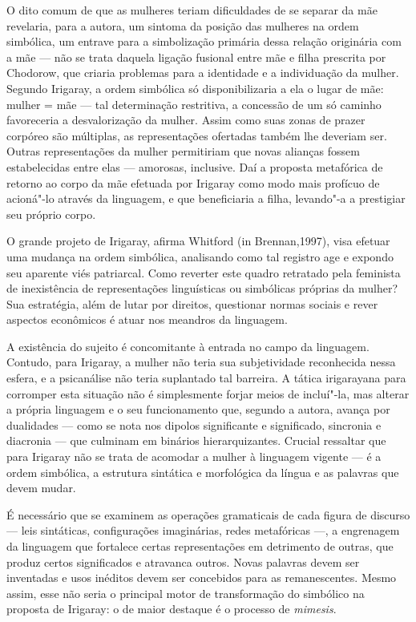 O dito comum de que as mulheres teriam dificuldades de se separar da mãe
revelaria, para a autora, um sintoma da posição das mulheres na ordem
simbólica, um entrave para a simbolização primária dessa relação
originária com a mãe --- não se trata daquela ligação fusional entre mãe
e filha prescrita por Chodorow, que criaria problemas para a identidade
e a individuação da mulher. Segundo Irigaray, a ordem simbólica só
disponibilizaria a ela o lugar de mãe: mulher = mãe --- tal determinação
restritiva, a concessão de um só caminho favoreceria a desvalorização da
mulher. Assim como suas zonas de prazer corpóreo são múltiplas, as
representações ofertadas também lhe deveriam ser. Outras representações
da mulher permitiriam que novas alianças fossem estabelecidas entre elas
--- amorosas, inclusive. Daí a proposta metafórica de retorno ao corpo
da mãe efetuada por Irigaray como modo mais profícuo de acioná"-lo
através da linguagem, e que beneficiaria a filha, levando"-a a prestigiar
seu próprio corpo.

O grande projeto de Irigaray, afirma Whitford (in Brennan,1997), visa
efetuar uma mudança na ordem simbólica, analisando como tal registro age
e expondo seu aparente viés patriarcal. Como reverter este quadro
retratado pela feminista de inexistência de representações linguísticas
ou simbólicas próprias da mulher? Sua estratégia, além de lutar por
direitos, questionar normas sociais e rever aspectos econômicos é atuar
nos meandros da linguagem.

A existência do sujeito é concomitante à entrada no campo da linguagem.
Contudo, para Irigaray, a mulher não teria sua subjetividade reconhecida
nessa esfera, e a psicanálise não teria suplantado tal barreira. A
tática irigarayana para corromper esta situação não é simplesmente
forjar meios de incluí"-la, mas alterar a própria linguagem e o seu
funcionamento que, segundo a autora, avança por dualidades --- como se
nota nos dipolos significante e significado, sincronia e diacronia ---
que culminam em binários hierarquizantes. Crucial ressaltar que para
Irigaray não se trata de acomodar a mulher à linguagem vigente --- é a
ordem simbólica, a estrutura sintática e morfológica da língua e as
palavras que devem mudar.

É necessário que se examinem as operações gramaticais de cada figura de
discurso --- leis sintáticas, configurações imaginárias, redes
metafóricas ---, a engrenagem da linguagem que fortalece certas
representações em detrimento de outras, que produz certos significados e
atravanca outros. Novas palavras devem ser inventadas e usos inéditos
devem ser concebidos para as remanescentes. Mesmo assim, esse não seria
o principal motor de transformação do simbólico na proposta de Irigaray:
o de maior destaque é o processo de \emph{mimesis}.


